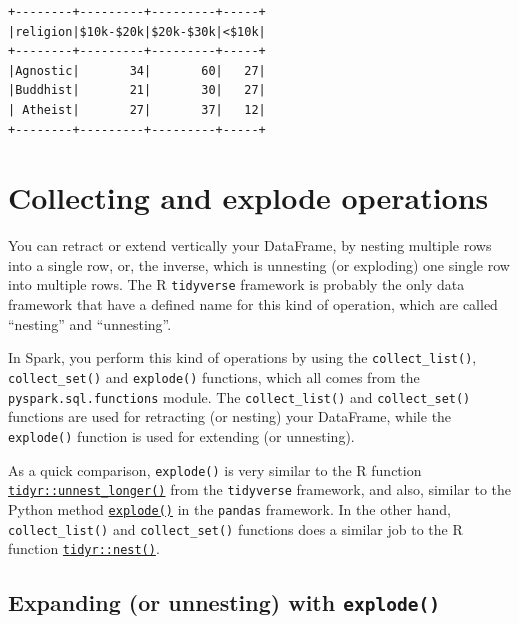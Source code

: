 \documentclass[
  11pt,
  letterpaper,
  DIV=11,
  numbers=noendperiod]{scrreprt}
\begin{document}
\begin{verbatim}
+--------+---------+---------+-----+
|religion|$10k-$20k|$20k-$30k|<$10k|
+--------+---------+---------+-----+
|Agnostic|       34|       60|   27|
|Buddhist|       21|       30|   27|
| Atheist|       27|       37|   12|
+--------+---------+---------+-----+
\end{verbatim}

\hypertarget{collecting-and-explode-operations}{%
\section{Collecting and explode
operations}\label{collecting-and-explode-operations}}

You can retract or extend vertically your DataFrame, by nesting multiple
rows into a single row, or, the inverse, which is unnesting (or
exploding) one single row into multiple rows. The R \texttt{tidyverse}
framework is probably the only data framework that have a defined name
for this kind of operation, which are called ``nesting'' and
``unnesting''.

In Spark, you perform this kind of operations by using the
\texttt{collect\_list()}, \texttt{collect\_set()} and \texttt{explode()}
functions, which all comes from the \texttt{pyspark.sql.functions}
module. The \texttt{collect\_list()} and \texttt{collect\_set()}
functions are used for retracting (or nesting) your DataFrame, while the
\texttt{explode()} function is used for extending (or unnesting).

As a quick comparison, \texttt{explode()} is very similar to the R
function
\href{https://tidyr.tidyverse.org/reference/unnest_longer.html}{\texttt{tidyr::unnest\_longer()}}
from the \texttt{tidyverse} framework, and also, similar to the Python
method
\href{https://pandas.pydata.org/docs/reference/api/pandas.DataFrame.explode.html}{\texttt{explode()}}
in the \texttt{pandas} framework. In the other hand,
\texttt{collect\_list()} and \texttt{collect\_set()} functions does a
similar job to the R function
\href{https://tidyr.tidyverse.org/reference/nest.html}{\texttt{tidyr::nest()}}.

\hypertarget{expanding-or-unnesting-with-explode}{%
\subsection{\texorpdfstring{Expanding (or unnesting) with
\texttt{explode()}}{Expanding (or unnesting) with explode()}}\label{expanding-or-unnesting-with-explode}}
\end{document}
